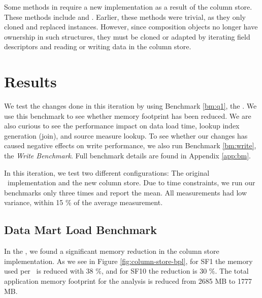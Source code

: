 Some methods in  require a new implementation as a result of the column store. These methods include  and . Earlier, these methods were trivial, as they only cloned and replaced  instances. However, since composition objects no longer have ownership in such structures, they must be cloned or adapted by iterating field descriptors and reading or writing data in the column store.

\section{Results}
\label{sec:Results}
We test the changes done in this iteration by using Benchmark \ref{bm:q1}, the \tpchdl. We use this benchmark to see whether memory footprint has been reduced. We are also curious to see the performance impact on data load time, lookup index generation (join), and source measure lookup. To see whether our changes has caused negative effects on write performance, we also run Benchmark \ref{bm:write}, the \textit{Write Benchmark}. Full benchmark details are found in Appendix \ref{app:bm}.

In this iteration, we test two different configurations: The original \gap~implementation and the new column store. Due to time constraints, we run our benchmarks only three times and report the mean. All measurements had low variance, within 15 \% of the average measurement.

\subsection{Data Mart Load Benchmark}
\label{column-store:q1}

In the \tpchdl, we found a significant memory reduction in the column store implementation. As we see in Figure \ref{fig:column-store-bpl}, for SF1 the memory used per \lineitem~is reduced with 38 \%, and for SF10 the reduction is 30 \%. The total application memory footprint for the analysis is reduced from 2685 MB to 1777 MB.

